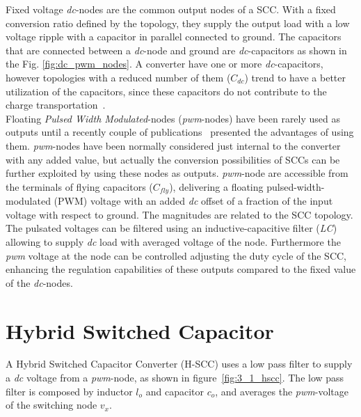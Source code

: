 Fixed voltage \emph{dc}-nodes are the common output nodes of a SCC. With a fixed conversion ratio defined by the topology, they supply the output load with a low voltage ripple with a capacitor in parallel connected to ground. The capacitors that are connected between a \emph{dc}-node and ground are  \emph{dc}-capacitors as shown in the Fig. \ref{fig:dc_pwm_nodes}. A converter have one or more \emph{dc}-capacitors, however topologies with a reduced number of them ($C_{dc}$) trend to have a better utilization of the capacitors, since these capacitors do not contribute to the charge transportation~\cite{Seeman:EECS-2009-78}.\\

Floating \emph{Pulsed Width Modulated}-nodes (\emph{pwm}-nodes) have been rarely used as outputs until a recently  couple of publications~\cite{2012Kumar, 2012Kline} presented the advantages of using them. \emph{pwm}-nodes have been normally considered just internal to the converter with any added value, but actually the conversion possibilities of SCCs can be further exploited by using these nodes as outputs.
\emph{pwm}-node are accessible from the terminals of flying capacitors ($C_{fly}$), delivering a floating pulsed-width-modulated (PWM) voltage with an added \emph{dc} offset of a fraction of the input voltage with respect to ground. The magnitudes are related to the SCC topology. The pulsated voltages can be filtered using an inductive-capacitive filter (\emph{LC}) allowing to supply \emph{dc} load with averaged voltage of the node. Furthermore the \emph{pwm} voltage at the node can be controlled adjusting the duty
cycle of the SCC, enhancing the regulation capabilities of these outputs compared to the fixed value of the \emph{dc}-nodes.






\section{Hybrid Switched Capacitor}
A Hybrid Switched Capacitor Converter (H-SCC) uses a low pass filter to supply a \emph{dc} voltage from a \emph{pwm}-node, as shown in figure~\ref{fig:3_1_hscc}. The low pass filter is composed by inductor $l_o$ and capacitor $c_o$, and averages the \emph{pwm}-voltage of the switching node $v_x$.


